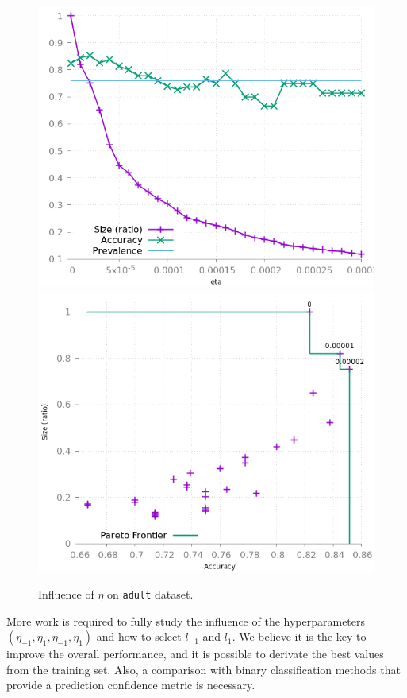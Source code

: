 \documentclass[preprint,12pt]{elsarticle}
\theoremstyle{definition}
\begin{document}
\begin{figure}[!h]\centering
\includegraphics[scale=0.3]{img/meta_adult.png}
\hfill
\includegraphics[scale=0.3]{img/meta_pareto_adult.png}
\caption{Influence of $\eta$ on \texttt{adult} dataset.}
\label{fig:meta_adult}
\end{figure}
More work is required to fully study the influence of the hyperparameters $(\eta_{-1}, \eta_1, \bar \eta_{-1}, \bar \eta_1)$ and how to select $l_{-1}$ and $l_1$. We believe it is the key to improve the overall performance, and it is possible to derivate the best values from the training set. Also, a comparison with binary classification methods that provide a prediction confidence metric is necessary.
\end{document}
